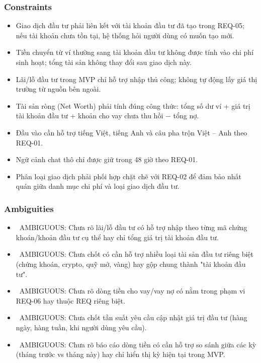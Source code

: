 \subsubsection{Constraints}

\begin{itemize}
\item Giao dịch đầu tư phải liên kết với tài khoản đầu tư đã tạo trong REQ-05; nếu tài khoản chưa tồn tại, hệ thống hỏi người dùng có muốn tạo mới.
\item Tiền chuyển từ ví thường sang tài khoản đầu tư không được tính vào chi phí sinh hoạt; tổng tài sản không thay đổi sau giao dịch này.
\item Lãi/lỗ đầu tư trong MVP chỉ hỗ trợ nhập thủ công; không tự động lấy giá thị trường từ nguồn bên ngoài.
\item Tài sản ròng (Net Worth) phải tính đúng công thức: tổng số dư ví + giá trị tài khoản đầu tư + khoản cho vay chưa thu hồi − tổng nợ.
\item Đầu vào cần hỗ trợ tiếng Việt, tiếng Anh và câu pha trộn Việt – Anh theo REQ-01.
\item Ngữ cảnh chat thô chỉ được giữ trong 48 giờ theo REQ-01.
\item Phân loại giao dịch phải phối hợp chặt chẽ với REQ-02 để đảm bảo nhất quán giữa danh mục chi phí và loại giao dịch đầu tư.
\end{itemize}
\subsubsection{Ambiguities}

\begin{itemize}
\item \warningicon\  AMBIGUOUS: Chưa rõ lãi/lỗ đầu tư có hỗ trợ nhập theo từng mã chứng khoán/khoản đầu tư cụ thể hay chỉ tổng giá trị tài khoản đầu tư.
\item \warningicon\  AMBIGUOUS: Chưa chốt có cần hỗ trợ nhiều loại tài sản đầu tư riêng biệt (chứng khoán, crypto, quỹ mở, vàng) hay gộp chung thành "tài khoản đầu tư".
\item \warningicon\  AMBIGUOUS: Chưa rõ dòng tiền cho vay/vay nợ có nằm trong phạm vi REQ-06 hay thuộc REQ riêng biệt.
\item \warningicon\  AMBIGUOUS: Chưa chốt tần suất yêu cầu cập nhật giá trị đầu tư (hàng ngày, hàng tuần, khi người dùng yêu cầu).
\item \warningicon\  AMBIGUOUS: Chưa rõ báo cáo dòng tiền có cần hỗ trợ so sánh giữa các kỳ (tháng trước vs tháng này) hay chỉ hiển thị kỳ hiện tại trong MVP.
\end{itemize}
